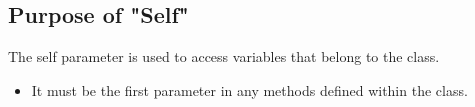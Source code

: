 \subsection{Purpose of "Self"}
The self parameter is used to access variables that belong to the class. 
\begin{itemize}
    \item It must be the first parameter in any methods defined within the class.
\end{itemize}